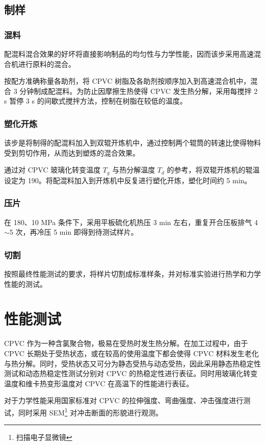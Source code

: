 \subsection{制样}

\subsubsection{混料}
配混料混合效果的好坏将直接影响制品的均匀性与力学性能，因而该步采用高速混合机进行原料的混合。\par
按配方准确称量各助剂，将 CPVC 树脂及各助剂按顺序加入到高速混合机中，混合 3 分钟制成配混料。为防止因摩擦生热使得 CPVC 发生热分解，采用每搅拌 2 s 暂停 3 s 的间歇式搅拌方法，控制在树脂在较低的温度。

\subsubsection{塑化开炼}
该步是将制得的配混料加入到双辊开炼机中，通过控制两个辊筒的转速比使得物料受到剪切作用，从而达到塑炼的混合效果。\par
通过对 CPVC 玻璃化转变温度 $T_g$ 与热分解温度 $T_d$ 的参考，将双辊开炼机的辊温设定为 190\cd。将配混料加入到开炼机中反复进行塑化开炼，塑化时间约 5 min。

\subsubsection{压片}
在 180\cd、10 MPa 条件下，采用平板硫化机热压 3 min 左右，重复开合压板排气 4$\sim$5 次，再冷压 5 min 即得到待测试样片。

\subsubsection{切割}
按照最终性能测试的要求，将样片切割成标准样条，并对标准实验进行热学和力学性能的测试。


\section{性能测试}
CPVC 作为一种含氯聚合物，极易在受热时发生热分解。在加工过程中，由于 CPVC 长期处于受热状态，或在较高的使用温度下都会使得 CPVC 材料发生老化与热分解。同时，受热状态又可分为静态受热与动态受热，因此采用静态热稳定性测试和动态热稳定性测试分别对 CPVC 的热稳定性进行表征。同时用玻璃化转变温度和维卡热变形温度对 CPVC 在高温下的性能进行表征。\par
对于力学性能采用国家标准对 CPVC 的拉伸强度、弯曲强度、冲击强度进行测试，同时采用 SEM\footnote{扫描电子显微镜} 对冲击断面的形貌进行观测。


